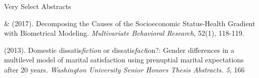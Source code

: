 \begin{rSection}{\textrm{Very Select Abstracts}}%
%
\begin{etaremune}



\item\meb \& \joe (2017). Decomposing the Causes of the Socioeconomic Status-Health Gradient with Biometrical Modeling. \textit{Multivariate Behavioral Research}, 52(1), 118-119. 

\item\meb (2013). Domestic dissatis{\em fiction} or dissatis{\em fact}ion?: Gender differences in a multilevel model of marital satisfaction using prenuptial marital expectations after 20 years. {\em Washington University Senior Honors Thesis Abstracts. 5}, 166
\end{etaremune}
\end{rSection}
